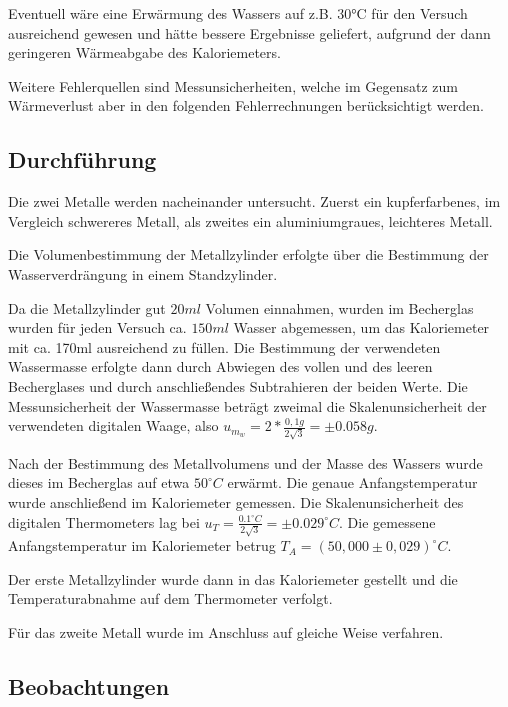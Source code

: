 \documentclass[class=article, crop=false]{standalone}
\begin{document}
Eventuell wäre eine Erwärmung des Wassers auf z.B. 30°C für den Versuch
ausreichend gewesen und hätte bessere Ergebnisse geliefert, aufgrund der
dann geringeren Wärmeabgabe des Kaloriemeters.

Weitere Fehlerquellen sind Messunsicherheiten, welche im Gegensatz zum
Wärmeverlust aber in den folgenden Fehlerrechnungen berücksichtigt
werden.

\hypertarget{durchfuxfchrung}{%
\subsection{Durchführung}\label{durchfuxfchrung}}

Die zwei Metalle werden nacheinander untersucht. Zuerst ein
kupferfarbenes, im Vergleich schwereres Metall, als zweites ein
aluminiumgraues, leichteres Metall.

Die Volumenbestimmung der Metallzylinder erfolgte über die Bestimmung
der Wasserverdrängung in einem Standzylinder.

Da die Metallzylinder gut \(20ml\) Volumen einnahmen, wurden im
Becherglas wurden für jeden Versuch ca. \(150ml\) Wasser abgemessen, um
das Kaloriemeter mit ca. 170ml ausreichend zu füllen. Die Bestimmung der
verwendeten Wassermasse erfolgte dann durch Abwiegen des vollen und des
leeren Becherglases und durch anschließendes Subtrahieren der beiden
Werte. Die Messunsicherheit der Wassermasse beträgt zweimal die
Skalenunsicherheit der verwendeten digitalen Waage, also
\(u_{m_w}=2*\frac{0,1g}{2\sqrt{3}}=\pm0.058g\).

Nach der Bestimmung des Metallvolumens und der Masse des Wassers wurde
dieses im Becherglas auf etwa \(50^\circ C\) erwärmt. Die genaue
Anfangstemperatur wurde anschließend im Kaloriemeter gemessen. Die
Skalenunsicherheit des digitalen Thermometers lag bei
\(u_T = \frac{0.1^\circ C}{2\sqrt{3}} = \pm0.029^\circ C\). Die
gemessene Anfangstemperatur im Kaloriemeter betrug
\(T_A=(50,000\pm 0,029)^\circ C\).

Der erste Metallzylinder wurde dann in das Kaloriemeter gestellt und die
Temperaturabnahme auf dem Thermometer verfolgt.

Für das zweite Metall wurde im Anschluss auf gleiche Weise verfahren.

\hypertarget{beobachtungen-1}{%
\subsection{Beobachtungen}\label{beobachtungen-1}}
\end{document}
